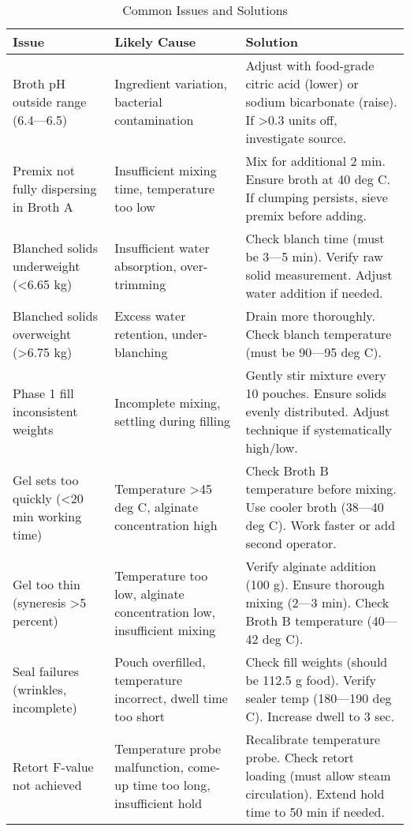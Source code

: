 {\begin{table}[h]
\centering
\caption{Common Issues and Solutions}
\label{tab:troubleshooting}
\begin{tabular}{@{}p{4cm}p{3.5cm}p{5cm}@{}}
\toprule
\textbf{Issue} & \textbf{Likely Cause} & \textbf{Solution} \\
\midrule
Broth pH outside range (6.4---6.5) & Ingredient variation, bacterial contamination & Adjust with food-grade citric acid (lower) or sodium bicarbonate (raise).
If >0.3 units off, investigate source. \\
\midrule
Premix not fully dispersing in Broth A & Insufficient mixing time, temperature too low & Mix for additional 2 min.
Ensure broth at 40 deg C. If clumping persists, sieve premix before adding.
\\
\midrule
Blanched solids underweight (<6.65 kg) & Insufficient water absorption, over-trimming & Check blanch time (must be 3---5 min).
Verify raw solid measurement. Adjust water addition if needed. \\
\midrule
Blanched solids overweight (>6.75 kg) & Excess water retention, under-blanching & Drain more thoroughly.
Check blanch temperature (must be 90---95 deg C). \\
\midrule
Phase 1 fill inconsistent weights & Incomplete mixing, settling during filling & Gently stir mixture every 10 pouches.
Ensure solids evenly distributed. Adjust technique if systematically high/low. \\
\midrule
Gel sets too quickly (<20 min working time) & Temperature >45 deg C, alginate concentration high & Check Broth B temperature before mixing.
Use cooler broth (38---40 deg C). Work faster or add second operator.
\\
\midrule
Gel too thin (syneresis >5 percent) & Temperature too low, alginate concentration low, insufficient mixing & Verify alginate addition (100 g).
Ensure thorough mixing (2---3 min). Check Broth B temperature (40---42 deg C).
\\
\midrule
Seal failures (wrinkles, incomplete) & Pouch overfilled, temperature incorrect, dwell time too short & Check fill weights (should be 112.5 g food).
Verify sealer temp (180---190 deg C). Increase dwell to 3 sec.
\\
\midrule
Retort F-value not achieved & Temperature probe malfunction, come-up time too long, insufficient hold & Recalibrate temperature probe.
Check retort loading (must allow steam circulation). Extend hold time to 50 min if needed.
\\
\midrule

\end{tabular}
\end{table}}
